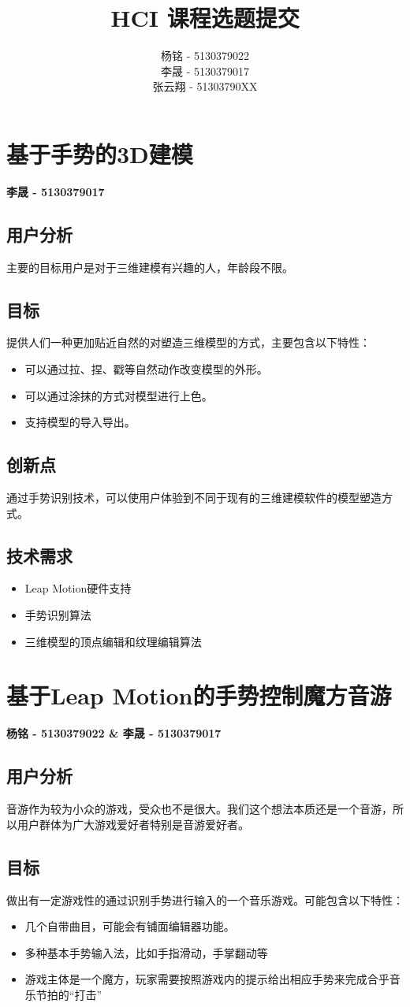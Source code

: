 \documentclass{article} \usepackage{CJK}
\author{杨铭 - 5130379022\\
        李晟 - 5130379017\\
        张云翔 - 51303790XX}
\title{HCI 课程选题提交}
\begin{document}
\maketitle
\newpage
\section{基于手势的3D建模}
\textbf{李晟 - 5130379017}
\subsection{用户分析}
主要的目标用户是对于三维建模有兴趣的人，年龄段不限。
\subsection{目标}
提供人们一种更加贴近自然的对塑造三维模型的方式，主要包含以下特性：
\begin{itemize}
	\item 可以通过拉、捏、戳等自然动作改变模型的外形。
	\item 可以通过涂抹的方式对模型进行上色。
	\item 支持模型的导入导出。
\end{itemize}
\subsection{创新点}
通过手势识别技术，可以使用户体验到不同于现有的三维建模软件的模型塑造方式。
\subsection{技术需求}
\begin{itemize}
	\item Leap Motion硬件支持
	\item 手势识别算法
	\item 三维模型的顶点编辑和纹理编辑算法
\end{itemize}
	
	
\newpage
\section{基于Leap Motion的手势控制魔方音游}
\textbf{杨铭 - 5130379022 \& 李晟 - 5130379017}
\subsection{用户分析}
音游作为较为小众的游戏，受众也不是很大。我们这个想法本质还是一个音游，所以用户群体为广大游戏爱好者特别是音游爱好者。
\subsection{目标}
做出有一定游戏性的通过识别手势进行输入的一个音乐游戏。可能包含以下特性：
\begin{itemize}
  \item 几个自带曲目，可能会有铺面编辑器功能。
  \item 多种基本手势输入法，比如手指滑动，手掌翻动等
  \item 游戏主体是一个魔方，玩家需要按照游戏内的提示给出相应手势来完成合乎音乐节拍的“打击”
\end{itemize}
\end{document}
